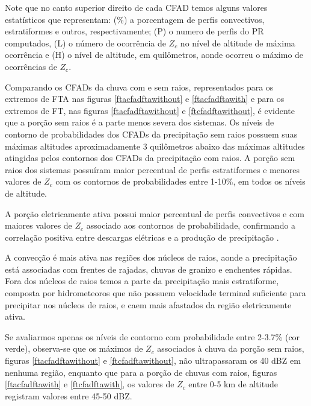 Note que no canto superior direito de cada CFAD temos alguns valores estatísticos que representam: (\%) a porcentagem de perfis convectivos, estratiformes e outros, respectivamente; (P) o numero de perfis do PR computados, (L) o número de ocorrência de $Z_c$ no nível de altitude de máxima ocorrência e (H) o nível de altitude, em quilômetros, aonde ocorreu o máximo de ocorrências de $Z_c$.

Comparando os CFADs da chuva com e sem raios, representados para os extremos de FTA nas figuras \ref{ftacfadftawithout} e \ref{ftacfadftawith} e para os extremos de FT, nas figuras \ref{ftacfadftawithout} e \ref{ftcfadftawithout}, é evidente que a porção sem raios é a parte menos severa dos sistemas. Os níveis de contorno de probabilidades dos CFADs da precipitação sem raios possuem suas máximas altitudes aproximadamente 3 quilômetros abaixo das máximas altitudes atingidas pelos contornos dos CFADs da precipitação com raios. A porção sem raios dos sistemas possuíram maior percentual de perfis estratiformes e menores valores de $Z_c$ com os contornos de probabilidades entre 1-10\%, em todos os níveis de altitude.

A porção eletricamente ativa possui maior percentual de perfis convectivos e com maiores valores de $Z_c$ associado aos contornos de probabilidade, confirmando a correlação positiva entre descargas elétricas e a produção de precipitação \cite{Petersen1998}.

A convecção é mais ativa nas regiões dos núcleos de raios, aonde a precipitação está associadas com frentes de rajadas, chuvas de granizo e enchentes rápidas. Fora dos núcleos de raios temos a parte da precipitação mais estratiforme, composta por hidrometeoros que não possuem velocidade terminal suficiente para precipitar nos núcleos de raios, e caem mais afastados da região eletricamente ativa.     %



Se avaliarmos apenas os níveis de contorno com probabilidade entre 2-3.7\% (cor verde), observa-se que os máximos de $Z_c$ associados à chuva da porção sem raios, figuras \ref{ftacfadftawithout} e \ref{ftcfadftawithout}, não ultrapassaram os 40 dBZ em nenhuma região, enquanto que para a porção de chuvas com raios, figuras \ref{ftacfadftawith} e \ref{ftcfadftawith}, os valores de $Z_c$ entre 0-5 km de altitude registram valores entre 45-50 dBZ.

